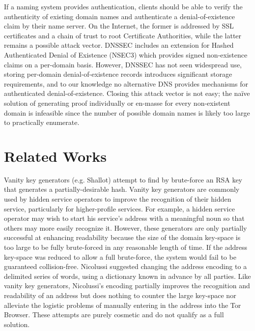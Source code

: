 \documentclass{sig-alternate}
\begin{document}
If a naming system provides authentication, clients should be able to verify the authenticity of existing domain names and authenticate a denial-of-existence claim by their name server. On the Internet, the former is addressed by SSL certificates and a chain of trust to root Certificate Authorities, while the latter remains a possible attack vector. DNSSEC includes an extension for Hashed Authenticated Denial of Existence (NSEC3) which provides signed non-existence claims on a per-domain basis. However, DNSSEC has not seen widespread use, storing per-domain denial-of-existence records introduces significant storage requirements, and to our knowledge no alternative DNS provides mechanisms for authenticated denial-of-existence. Closing this attack vector is not easy; the na\"{i}ve solution of generating proof individually or en-masse for every non-existent domain is infeasible since the number of possible domain names is likely too large to practically enumerate.

\section{Related Works}
\label{sec:RelatedWorks}

Vanity key generators (e.g. Shallot\cite{KatmagicShallot}) attempt to find by brute-force an RSA key that generates a partially-desirable hash. Vanity key generators are commonly used by hidden service operators to improve the recognition of their hidden service, particularly for higher-profile services.\cite{syversongenuine} For example, a hidden service operator may wish to start his service's address with a meaningful noun so that others may more easily recognize it. However, these generators are only partially successful at enhancing readability because the size of the domain key-space is too large to be fully brute-forced in any reasonable length of time. If the address key-space was reduced to allow a full brute-force, the system would fail to be guaranteed collision-free. Nicolussi suggested changing the address encoding to a delimited series of words, using a dictionary known in advance by all parties.\cite{nicolussi2011human} Like vanity key generators, Nicolussi's encoding partially improves the recognition and readability of an address but does nothing to counter the large key-space nor alleviate the logistic problems of manually entering in the address into the Tor Browser. These attempts are purely cosmetic and do not qualify as a full solution.
\end{document}
